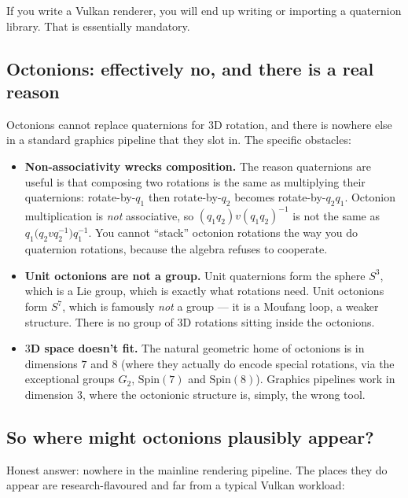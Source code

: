 \documentclass[11pt]{article}
\begin{document}
If you write a Vulkan renderer, you will end up writing or importing
a quaternion library. That is essentially mandatory.

\subsection*{Octonions: effectively no, and there is a real reason}

Octonions cannot replace quaternions for $3$D rotation, and there is
nowhere else in a standard graphics pipeline that they slot in. The
specific obstacles:

\begin{itemize}[leftmargin=*, itemsep=2pt]
  \item \textbf{Non-associativity wrecks composition.} The reason
        quaternions are useful is that composing two rotations is the
        same as multiplying their quaternions: rotate-by-$q_1$ then
        rotate-by-$q_2$ becomes rotate-by-$q_2 q_1$. Octonion
        multiplication is \emph{not} associative, so
        $(q_1 q_2) v (q_1 q_2)^{-1}$ is not the same as
        $q_1\bigl(q_2 v q_2^{-1}\bigr) q_1^{-1}$. You cannot ``stack''
        octonion rotations the way you do quaternion rotations,
        because the algebra refuses to cooperate.
  \item \textbf{Unit octonions are not a group.} Unit quaternions form
        the sphere $S^3$, which is a Lie group, which is exactly what
        rotations need. Unit octonions form $S^7$, which is famously
        \emph{not} a group --- it is a Moufang loop, a weaker
        structure. There is no group of $3$D rotations sitting inside
        the octonions.
  \item \textbf{$3$D space doesn't fit.} The natural geometric home
        of octonions is in dimensions $7$ and $8$ (where they
        actually do encode special rotations, via the exceptional
        groups $G_2$, $\mathrm{Spin}(7)$ and $\mathrm{Spin}(8)$).
        Graphics pipelines work in dimension $3$, where the
        octonionic structure is, simply, the wrong tool.
\end{itemize}

\subsection*{So where might octonions plausibly appear?}

Honest answer: nowhere in the mainline rendering pipeline. The
places they do appear are research-flavoured and far from a typical
Vulkan workload:
\end{document}
